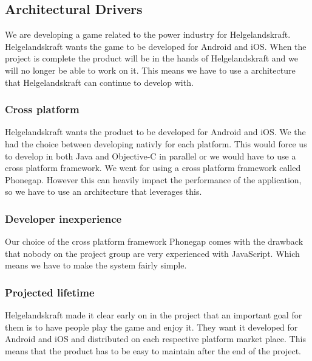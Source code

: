 \subsection{Architectural Drivers}
We are developing a game related to the power industry for Helgelandskraft. Helgelandskraft wants the game to be developed for Android and iOS. When the project is complete the product will be in the hands of Helgelandskraft and we will no longer be able to work on it. This means we have to use a architecture that Helgelandskraft can continue to develop with.

\subsubsection{Cross platform}
Helgelandskraft wants the product to be developed for Android and iOS. We the had the choice between developing nativly for each platform. This would force us to develop in both Java and Objective-C in parallel or we would have to use a cross platform framework. We went for using a cross platform framework called Phonegap. However this can heavily impact the performance of the application, so we have to use an architecture that leverages this.

\subsubsection{Developer inexperience}
Our choice of the cross platform framework Phonegap comes with the drawback that nobody on the project group are very experienced with JavaScript. Which means we have to make the system fairly simple.

\subsubsection{Projected lifetime}
Helgelandskraft made it clear early on in the project that an important goal for them is to have people play the game and enjoy it. They want it developed for Android and iOS and distributed on each respective platform market place. This means that the product has to be easy to maintain after the end of the project.
